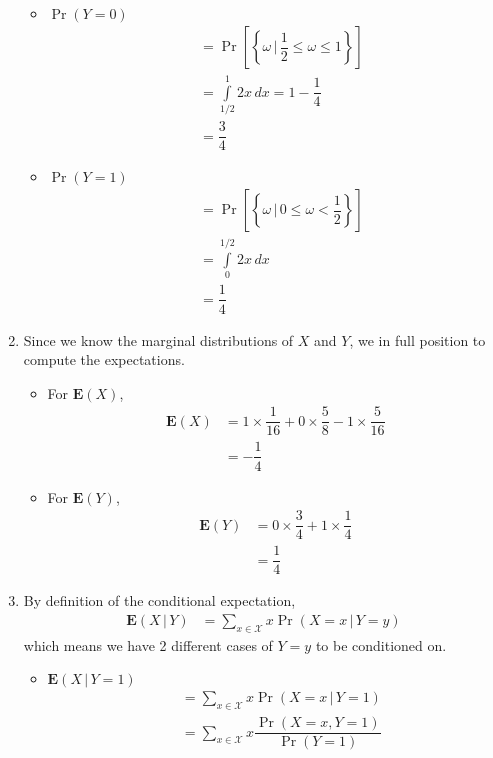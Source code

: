 \documentclass[answers]{exam}
\begin{document}
\begin{questions}
\begin{solution}
\begin{enumerate}[(1)]
\begin{itemize}
        \item $\Pr(Y=0)$
        \begin{align}
          &= \Pr\left[\left\lbrace \omega\,|\, \dfrac{1}{2}\leq \omega\leq 1\right\rbrace \right]\\
          &= \int\limits_{1/2}^{1}2x\,dx = 1-\dfrac{1}{4}\\
          &= \dfrac{3}{4}
        \end{align}
        \item $\Pr(Y=1)$
        \begin{align}
          &= \Pr\left[\left\lbrace \omega\,|\,0\leq \omega < \dfrac{1}{2}\right\rbrace  \right]\\
          &= \int\limits_{0}^{1/2}2x\,dx\\
          &= \dfrac{1}{4}
        \end{align}
      \end{itemize}
      \item Since we know the marginal distributions of $X$ and $Y$, we in full position to compute the expectations.
      \begin{itemize}
        \item For $\mathbf{E}(X)$,
        \begin{align}
          \mathbf{E}(X) &= 1\times \dfrac{1}{16}+0\times \dfrac{5}{8}-1\times \dfrac{5}{16}\\
          &= -\dfrac{1}{4}
        \end{align}
        \item For $\mathbf{E}(Y)$,
        \begin{align}
          \mathbf{E}(Y) &= 0\times \dfrac{3}{4}+1\times \dfrac{1}{4}\\
          &= \dfrac{1}{4}
        \end{align}
      \end{itemize}
      \item By definition of the conditional expectation,
      \begin{align}
        \mathbf{E}(X\,|\,Y) &= \sum_{x\in \mathcal{X}}x\Pr(X=x\,|\,Y=y)
      \end{align}
      which means we have 2 different cases of $Y=y$ to be conditioned on.
      \begin{itemize}
          \item $\mathbf{E}(X\,|\,Y=1)$
          \begin{align}
            &= \sum_{x\in \mathcal{X}} x\Pr(X=x\,|\,Y=1)\\
            &= \sum_{x\in \mathcal{X}} x\dfrac{\Pr(X=x,Y=1)}{\Pr(Y=1)}\\

\end{align}
\end{itemize}
\end{enumerate}
\end{solution}
\end{questions}
\end{document}
